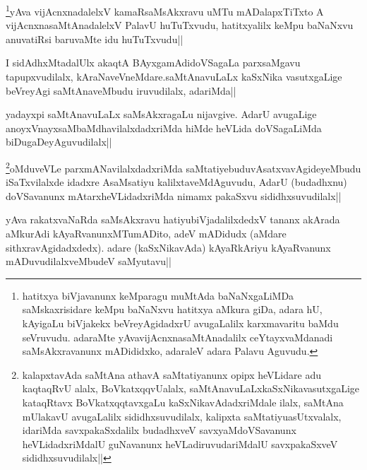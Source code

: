 \begin{artha}
\footnote{hatitxya biVjavanunx keMparagu muMtAda baNaNxgaLiMDa saMskaxrisidare keMpu baNaNxvu  hatitxya aMkura giDa, adara hU, kAyigaLu biVjakekx beVreyAgidadxrU avugaLalilx karxmavaritu baMdu seVruvudu. adaraMte yAvavijAcnxnasaMtAnadalilx ceYtayxvaMdanadi saMsAkxravanunx mADididxko, adaraleV adara Palavu Aguvudu.}yAva vijAcnxnadalelxV kamaRsaMsAkxravu uMTu mADalapxTiTxto A vijAcnxnasaMtAnadalelxV PalavU huTuTxvudu, hatitxyalilx keMpu baNaNxvu anuvatiRsi baruvaMte idu huTuTxvudu||
\end{artha}

\begin{artha}
I sidAdhxMtadalUlx akaqtA BAyxgamAdidoVSagaLa parxsaMgavu tapupxvudilalx, kAraNaveVneMdare.saMtAnavuLaLx kaSxNika vasutxgaLige beVreyAgi saMtAnaveMbudu iruvudilalx, adariMda||
\end{artha}

\begin{artha}
yadayxpi saMtAnavuLaLx saMsAkxragaLu nijavgive. AdarU avugaLige anoyxVnayxsaMbaMdhavilalxdadxriMda hiMde heVLida doVSagaLiMda biDugaDeyAguvudilalx||
\end{artha}

\begin{artha}
\footnote{kalapxtavAda saMtAna athavA saMtatiyanunx opipx heVLidare adu kaqtaqRvU alalx,  BoVkatxqqvUalalx, saMtAnavuLaLxkaSxNikavasutxgaLige kataqRtavx BoVkatxqqtavxgaLu kaSxNikavAdadxriMdale ilalx, saMtAna mUlakavU avugaLalilx sididhxsuvudilalx, kalipxta saMtatiyuasUtxvalalx, idariMda savxpakaSxdalilx budadhxveV savxyaMdoVSavanunx heVLidadxriMdalU guNavanunx heVLadiruvudariMdalU savxpakaSxveV sididhxsuvudilalx||}oMduveVLe parxmANavilalxdadxriMda saMtatiyebuduvAsatxvavAgideyeMbudu iSaTxvilalxde idadxre AsaMsatiyu kalilxtaveMdAguvudu, AdarU (budadhxnu) doVSavanunx mAtarxheVLidadxriMda nimamx pakaSxvu sididhxsuvudilalx||
\end{artha}

\begin{artha}
yAva rakatxvaNaRda saMsAkxravu hatiyubiVjadalilxdedxV tananx akArada aMkurAdi kAyaRvanunxMTumADito, adeV mADidudx (aMdare sithxravAgidadxdedx). adare (kaSxNikavAda) kAyaRkAriyu kAyaRvanunx mADuvudilalxveMbudeV saMyutavu||
\end{artha}

